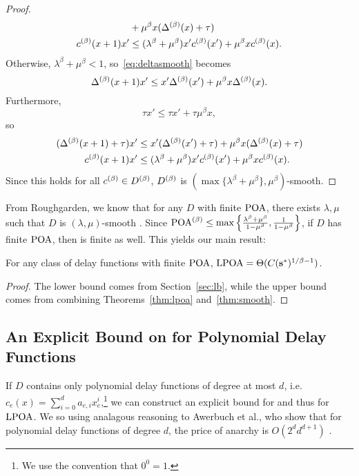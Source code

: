 \documentclass[twoside]{article}
\begin{document}
\begin{multicols}{2}
\begin{proof}
\begin{align*}
    &+ \mu^\beta x (\Delta^{(\beta)}(x) + \tau) \\
    c^{(\beta)}(x+1) x' &\le (\lambda^\beta + \mu^\beta) x' c^{(\beta)}(x') +
    \mu^\beta x c^{(\beta)}(x).
  \end{align*}
  Otherwise, $\lambda^\beta + \mu^\beta < 1$, so~\eqref{eq:deltasmooth} becomes
  \[
    \Delta^{(\beta)}(x+1) x' \le x' \Delta^{(\beta)}(x') +
    \mu^\beta x \Delta^{(\beta)}(x).
  \]
  Furthermore,
  \[
    \tau x' \le \tau x' + \tau\mu^\beta x,
  \]
  so
  \begin{align*}
    (\Delta^{(\beta)}(x+1) + \tau) x' &\le x' (\Delta^{(\beta)}(x') + \tau)
    + \mu^\beta x (\Delta^{(\beta)}(x) + \tau) \\
    c^{(\beta)}(x+1) x' &\le (\lambda^\beta + \mu^\beta) x' c^{(\beta)}(x') +
    \mu^\beta x c^{(\beta)}(x).
  \end{align*}
  Since this holds for all $c^{(\beta)} \in D^{(\beta)}$, $D^{(\beta)}$ is
  $(\max\{\lambda^\beta + \mu^\beta\}, \mu^\beta)$-smooth.
\end{proof}

From Roughgarden, we know that for any $D$ with finite $\text{POA}$, there exists
$\lambda,\mu$ such that $D$ is $(\lambda,\mu)$-smooth \cite{Roughgarden2012}.
Since $\text{POA}^{(\beta)} \le \max\left\{\frac{\lambda^\beta +
\mu^\beta}{1-\mu^\beta}, \frac{1}{1-\mu^\beta}\right\}$, if $D$ has finite
$\text{POA}$, then \poab is finite as well. This yields our main result:
\begin{thm} \label{thm:main}
 For any class of delay functions with finite $\text{POA}$, $\text{LPOA} =
 \Theta(C(\mathbf{s}^*)^{1/\beta-1})$.
\end{thm}
\begin{proof}
  The lower bound comes from Section~\ref{sec:lb}, while the upper bound comes
  from combining Theorems~\ref{thm:lpoa} and~\ref{thm:smooth}.
\end{proof}

\subsection{An Explicit Bound on \poab for Polynomial Delay Functions}
If $D$ contains only polynomial delay functions of degree at most $d$, i.e.
$c_e(x) = \sum_{i=0}^d a_{e,i} x_e^i$,\footnote{We use the convention that $0^0
= 1$.} we can construct an explicit bound for \poab and thus for $\text{LPOA}$. We
so using analagous reasoning to Awerbuch et al., who show that for polynomial
delay functions of degree $d$, the price of anarchy is $O(2^d d^{d+1})$
\cite{Awerbuch2005}.


\end{multicols}
\end{document}

